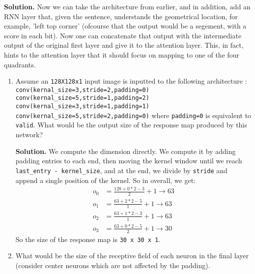 \documentclass{article}
\begin{document}
\begin{enumerate}
\begin{enumerate}
        \textbf{Solution.} Now we can take the architecture from earlier, and in addition, add an RNN layer that, given the sentence, understands the geometrical location, for example, 'left top corner' (ofcourse that the output would be a segement, with a score in each bit). Now one can concatenate that output with the intermediate output of the original first layer and give it to the attention layer. This, in fact, hints to the attention layer that it should focus on mapping to one of the four quadrants.
    \end{enumerate}
    \begin{enumerate}
      \item Assume an \verb|128X128x1| input image is inputted to the following architecture :
\verb|conv(kernal_size=3,stride=2,padding=0)|
\verb|conv(kernal_size=5,stride=1,padding=2)|
\verb|conv(kernal_size=3,stride=1,padding=1)|
\verb|conv(kernal_size=5,stride=2,padding=0)|
where \verb|padding=0| is equivalent to \verb|valid|. What would be the output size of the response map produced by this network?
        

\textbf{Solution.} We compute the dimension directly. We compute it by adding padding entries to each end, then moving the kernel window until we reach \verb|last_entry - kernel_size|, and at the end, we divide by \verb|stride| and append a single position of the kernel. So in overall, we get:
\begin{equation*}
  \begin{split}
      o_0 &=  \frac{  128 + 0 * 2 - 3}{2} + 1 \rightarrow 63  \\
      o_1 &=  \frac{ 63 + 2 * 2 - 5}{1} + 1 \rightarrow 63 \\
      o_2 &=  \frac{  63 + 1 * 2 - 3}{1} + 1\rightarrow 63 \\
      o_3 &=  \frac{  63 + 0 * 2 - 5}{2} + 1 \rightarrow 30 
    \end{split}
\end{equation*}
So the size of the response map is \verb|30 x 30 x 1|. 
\item What would be the size of the receptive field of each neuron in the final layer (consider center neurons which are not affected by the padding).


\end{enumerate}
\end{enumerate}
\end{document}

